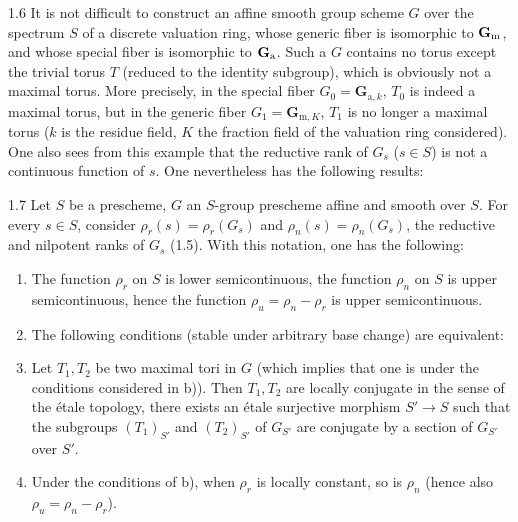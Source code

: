 \begin{remark}{1.6}\label{XII.1.6}
It is not difficult to construct an affine smooth group scheme $G$ over the spectrum $S$ of a discrete valuation ring, whose generic fiber is isomorphic to $\mathbf{G}_{\mathrm{m}}$, and whose special fiber is isomorphic to $\mathbf{G}_{\mathrm{a}}$. Such a $G$ contains no torus except the trivial torus $T$ (reduced to the identity subgroup), which is obviously not a maximal torus. More precisely, in the special fiber $G_0=\mathbf G_{\mathrm a,k}$, $T_0$ is indeed a maximal torus, but in the generic fiber $G_1=\mathbf G_{\mathrm m,K}$, $T_1$ is no longer a maximal torus ($k$ is the residue field, $K$ the fraction field of the valuation ring considered). One also sees from this example that the reductive rank of $G_s$ ($s\in S$) is not a continuous function of $s$. One nevertheless has the following results:
\end{remark}
\begin{theorem}{1.7}\label{XII.1.7}
Let $S$ be a prescheme, $G$ an $S$-group prescheme affine and smooth over $S$. For every $s\in S$, consider $\rho_r(s)=\rho_r(G_s)$ and $\rho_n(s)=\rho_n(G_s)$, the reductive and nilpotent ranks of $G_s$ (1.5). With this notation, one has the following:
\begin{enumerate}[label=\alph*)]
\item The function $\rho_r$ on $S$ is lower semicontinuous, the function $\rho_n$ on $S$ is upper semicontinuous, hence the function $\rho_u=\rho_n-\rho_r$ is upper semicontinuous.
\item The following conditions (stable under arbitrary base change) are equivalent:
\item Let $T_1,T_2$ be two maximal tori in $G$ (which implies that one is under the conditions considered in b)). Then $T_1,T_2$ are locally conjugate in the sense of the étale topology, \ie there exists an étale surjective morphism $S'\to S$ such that the subgroups $(T_1)_{S'}$ and $(T_2)_{S'}$ of $G_{S'}$ are conjugate by a section of $G_{S'}$ over $S'$.
\item Under the conditions of b), \ie when $\rho_r$ is locally constant, so is $\rho_n$ (hence also $\rho_u=\rho_n-\rho_r$).
\end{enumerate}
\end{theorem}
